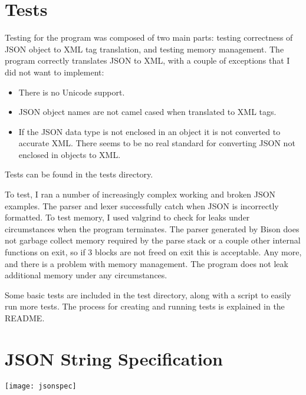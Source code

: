 \documentclass[12pt]{article}
\begin{document}
\section{Tests}
Testing for the program was composed of two main parts: testing
correctness of JSON object to XML tag translation, and testing memory
management.  The program correctly translates JSON to XML, with a
couple of exceptions that I did not want to implement:
\begin{itemize}
\item There is no Unicode support.
\item JSON object names are not camel cased when translated to XML tags.
\item If the JSON data type is not enclosed in an object it is not
  converted to accurate XML.  There seems to be no real standard for
  converting JSON not enclosed in objects to XML.
\end{itemize}
Tests can be found in the tests directory.\par
To test, I ran a number of increasingly complex working and broken
JSON examples.  The parser and lexer successfully catch when JSON is
incorrectly formatted. To test memory, I used valgrind to check for
leaks under circumstances when the program terminates.  The parser
generated by Bison does not garbage collect memory required by the
parse stack or a couple other internal functions on exit, so if 3
blocks are not freed on exit this is acceptable.  Any more, and there
is a problem with memory management.  The program does not leak
additional memory under any circumstances.\par
Some basic tests are included in the test directory, along with a
script to easily run more tests.  The process for creating and running
tests is explained in the README.

\pagebreak


\pagebreak
\appendix
\section{JSON String Specification}
\texttt{[image: jsonspec]}
\end{document}
